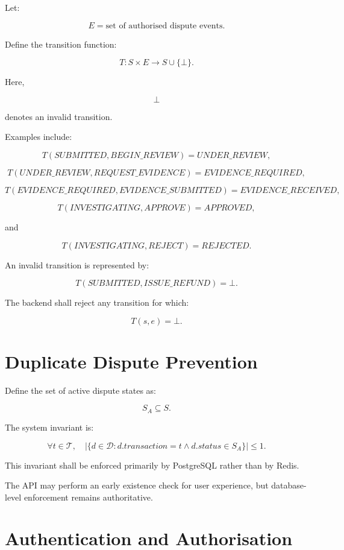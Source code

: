 \documentclass[11pt,a4paper]{article}
\begin{document}
Let:

\[
E = \text{set of authorised dispute events}.
\]

Define the transition function:

\[
T:S\times E\rightarrow S\cup\{\bot\}.
\]

Here,

\[
\bot
\]

denotes an invalid transition.

Examples include:

\[
T(SUBMITTED,BEGIN\_REVIEW)
=
UNDER\_REVIEW,
\]

\[
T(UNDER\_REVIEW,REQUEST\_EVIDENCE)
=
EVIDENCE\_REQUIRED,
\]

\[
T(EVIDENCE\_REQUIRED,EVIDENCE\_SUBMITTED)
=
EVIDENCE\_RECEIVED,
\]

\[
T(INVESTIGATING,APPROVE)
=
APPROVED,
\]

and

\[
T(INVESTIGATING,REJECT)
=
REJECTED.
\]

An invalid transition is represented by:

\[
T(SUBMITTED,ISSUE\_REFUND)
=
\bot.
\]

The backend shall reject any transition for which:

\[
T(s,e)=\bot.
\]

\section{Duplicate Dispute Prevention}

Define the set of active dispute states as:

\[
S_A \subseteq S.
\]

The system invariant is:

\[
\forall t\in\mathcal{T},
\quad
\left|
\{
d\in\mathcal{D}
:
d.transaction=t
\land
d.status\in S_A
\}
\right|
\leq 1.
\]

This invariant shall be enforced primarily by PostgreSQL rather than by
Redis.

The API may perform an early existence check for user experience, but
database-level enforcement remains authoritative.

\section{Authentication and Authorisation}
\end{document}
